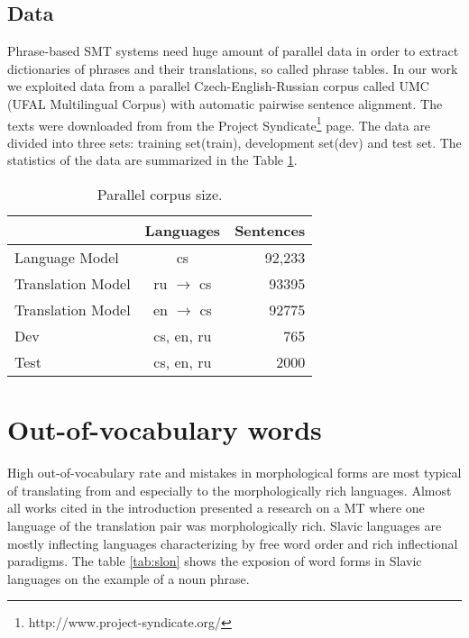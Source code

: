 \documentclass[11pt,letterpaper]{article}
\begin{document}
\subsection{Data}
Phrase-based SMT systems need huge amount of parallel data in order to
extract dictionaries of phrases and their translations, so called phrase tables.
In our work we exploited data from a parallel Czech-English-Russian
corpus called UMC (UFAL Multilingual Corpus) with automatic pairwise sentence
alignment. The texts were downloaded from from the Project
Syndicate\footnote{http://www.project-syndicate.org/} page. 
The data are divided into three sets: training set(train),
development set(dev) and test set.
The statistics of the data are summarized in the Table \ref{tab:corpus}.
\begin{table}

\begin{center}
\begin{tabular}{lcr}
  &  Languages & Sentences \\
\hline
Language Model & cs & 92,233 \\
Translation Model & ru $\rightarrow$ cs &  93395\\
Translation Model & en $\rightarrow$ cs &  92775\\ \hline %
Dev     & cs, en, ru          &    765 \\
Test     & cs, en, ru          &  2000 \\
\hline
\end{tabular}
\end{center}
\caption{Parallel corpus size.}
\label{tab:corpus}
\end{table}


\section{Out-of-vocabulary words} 
High out-of-vocabulary rate and mistakes in morphological forms
are most typical of translating from and especially to 
the morphologically rich languages. Almost all works cited in the introduction 
presented a research on a MT where one language of the translation pair was morphologically rich.
Slavic languages are mostly inflecting languages characterizing by free word order and rich
inflectional paradigms. %
The table \ref{tab:slon} shows the exposion of word forms in Slavic languages on
the example of a noun phrase.
\end{document}
